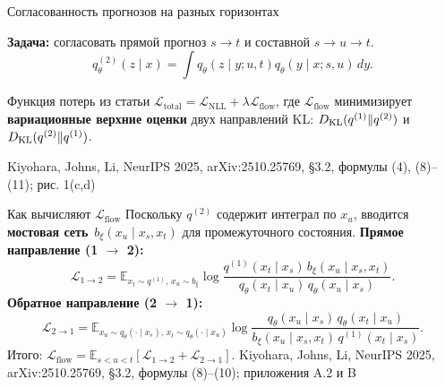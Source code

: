 \documentclass[10pt,aspectratio=169]{beamer}
\newcommand{\nsfsrc}[1]{\vfill{\tiny\color{graytext}Kiyohara, Johns, Li, NeurIPS 2025, arXiv:2510.25769, #1}}
\begin{document}
\begin{frame}{Согласованность прогнозов на разных горизонтах}
\vspace{0.02cm}
\begin{center}
\end{center}
\vspace{0.07cm}
\textbf{Задача:} согласовать прямой прогноз $s\to t$ и составной $s\to u\to t$.
\[
q_\theta^{(2)}(z\mid x)=\int q_\theta(z\mid y;u,t)
q_\theta(y\mid x;s,u)\,dy.
\]
\vspace{-0.06cm}
\begin{block}{Функция потерь из статьи}
$\displaystyle \mathcal L_{\mathrm{total}}=\mathcal L_{\mathrm{NLL}}+
\lambda\mathcal L_{\mathrm{flow}}$,
где $\mathcal L_{\mathrm{flow}}$ минимизирует \textbf{вариационные верхние оценки} двух направлений KL:
$D_{\rm KL}(q^{(1)}\Vert q^{(2)})$ и $D_{\rm KL}(q^{(2)}\Vert q^{(1)})$.
\end{block}
\nsfsrc{\S 3.2, формулы (4), (8)--(11); рис. 1(c,d)}
\end{frame}

\begin{frame}[shrink=5]{Как вычисляют $\mathcal L_{\mathrm{flow}}$}
\vspace{0.08cm}
Поскольку $q^{(2)}$ содержит интеграл по $x_u$, вводится \textbf{мостовая сеть}
$\,b_\xi(x_u\mid x_s,x_t)$ для промежуточного состояния.
\vspace{0.14cm}
\textbf{Прямое направление (1 $\to$ 2):}
\[
\mathcal L_{1\to2}=
\mathbb E_{x_t\sim q^{(1)},\,x_u\sim b_\xi}
\log\frac{q^{(1)}(x_t\mid x_s)\,b_\xi(x_u\mid x_s,x_t)}
{q_\theta(x_t\mid x_u)\,q_\theta(x_u\mid x_s)}.
\]
\textbf{Обратное направление (2 $\to$ 1):}
\[
\mathcal L_{2\to1}=
\mathbb E_{x_u\sim q_\theta(\cdot\mid x_s),\,x_t\sim q_\theta(\cdot\mid x_u)}
\log\frac{q_\theta(x_u\mid x_s)\,q_\theta(x_t\mid x_u)}
{b_\xi(x_u\mid x_s,x_t)\,q^{(1)}(x_t\mid x_s)}.
\]
\vspace{0.02cm}
\small Итого: $\displaystyle\mathcal L_{\mathrm{flow}}=\mathbb E_{s<u<t}[\mathcal L_{1\to2}+\mathcal L_{2\to1}]$.
\nsfsrc{\S 3.2, формулы (8)--(10); приложения A.2 и B}
\end{frame}
\end{document}
